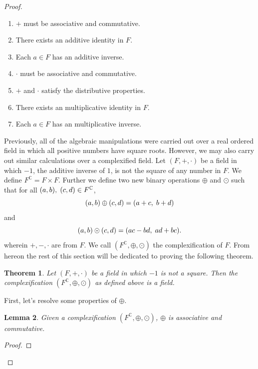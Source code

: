 \documentclass[12pt]{article}
\newcommand{\C}{\mathbb{C}}
\newcommand{\ttc}{, \hspace{1mm}}
\theoremstyle{plain}
\newtheorem{theorem}{Theorem}[section]
\newtheorem{lemma}[theorem]{Lemma}
\theoremstyle{definition}
\begin{document}
\begin{appendices}
\begin{proof}
\begin{enumerate}
	\item $+$ must be associative and commutative.
	\item There exists an additive identity in $F$.
	\item Each $a\in F$ has an additive inverse.
	\item $\cdot$ must be associative and commutative.
	\item $+$ and $\cdot$ satisfy the distributive properties.
	\item There exists an multiplicative identity in $F$.
	\item Each $a\in F$ has an multiplicative inverse.
\end{enumerate}
Previously, all of the algebraic manipulations were carried out over a real ordered field in which all positive numbers have square roots. However, we may also carry out similar calculations over a complexified field. Let $(F,+,\cdot)$ be a field in which $-1$, the additive inverse of $1$, is not the square of any number in $F$. We define $F^\C = F\times F$. Further we define two new binary operations $\oplus$ and $\odot$ such that for all $(a,b)\ttc (c,d)\in F^\C$,
	\[
		(a,b)\oplus(c,d) = (a + c\ttc b + d)
	\]
and
	\[
		(a,b)\odot(c,d) = (ac - bd\ttc ad + bc).
	\]
wherein $+,-,\cdot$ are from $F$. We call $(F^\C,\oplus,\odot)$ the complexification of $F$. From hereon the rest of this section will be dedicated to proving the following theorem.

\begin{theorem}
	Let $(F,+,\cdot)$ be a field in which $-1$ is not a square. Then the complexification $(F^\C,\oplus,\odot)$ as defined above is a field.
\end{theorem}

\noindent First, let's resolve some properties of $\oplus$.\\

\begin{lemma}
	Given a complexification $(F^\C,\oplus,\odot)$, $\oplus$ is associative and commutative.
\end{lemma}

\begin{proof}


\end{proof}
\end{proof}
\end{appendices}
\end{document}
